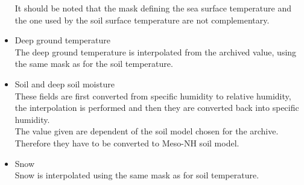 \begin{itemize}
It should be noted that the mask defining the sea surface temperature and the one used
by the soil surface temperature are not complementary.
\item Deep ground temperature\\
The deep ground temperature is interpolated from the archived value, using the same mask
as for the soil temperature.
\item Soil and deep soil moisture\\
These fields are first converted from specific humidity to relative humidity, the
interpolation is performed and then they are converted back into specific humidity.\\
The value given are dependent of the soil model chosen for the archive. Therefore they
have to be converted to Meso-NH soil model.
\item Snow\\
Snow is interpolated using the same mask as for soil temperature.
\end{itemize}



